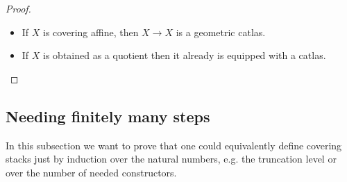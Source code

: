 \begin{proof}
\begin{itemize}
	\item If 	$X$ is covering affine, then $X \to X$ is a geometric catlas. 
	\item If $X$ is obtained as a quotient then it already is equipped with a catlas. %
	
\end{itemize}
\end{proof}

\subsection{Needing finitely many steps}
In this subsection we want to prove that one could equivalently define covering stacks just by induction over the natural numbers, e.g. the truncation level or over the number of needed constructors.


